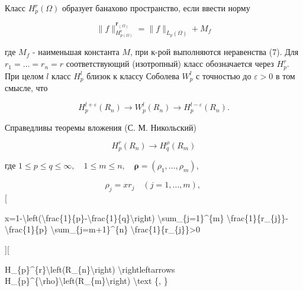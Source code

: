 \documentclass[10pt]{article}
\begin{document}
Класс $H_{p}^{r}(\Omega)$ образует банахово пространство, если ввести норму



\[

\|f\|_{H_{p(\Omega)}^{r}}^{\boldsymbol{r}_{(\Omega)}}=\|f\|_{L_{p}(\Omega)}+M_{f}

\]



где $M_{f}$ - наименьшая константа $M$, при к-рой выполняются неравенства (7). Для $r_{1}=\ldots=r_{n}=r$ соответствующий (изотропный) класс обозначается через $H_{p}^{r}$. При целом $l$ класс $H_{p}^{l}$ близок к классу Соболева $W_{p}^{l}$ с точностью до $\varepsilon>0$ в том смысле, что



\[

H_{p}^{l+\varepsilon}\left(R_{n}\right) \longrightarrow W_{p}^{l}\left(R_{n}\right) \longrightarrow H_{p}^{l-\varepsilon}\left(R_{n}\right) .

\]



Справедливы теоремы вложения (С. М. Никольский)



\[

H_{p}^{r}\left(R_{n}\right) \longrightarrow H_{q}^{\rho}\left(R_{m}\right)

\]



где $1 \leqslant p \leqslant q \leqslant \infty, \quad 1 \leqslant m \leqslant n, \quad \boldsymbol{\rho}=\left(\rho_{1}, \ldots, \rho_{m}\right)$,



\[

\rho_{j}=x r_{j} \quad(j=1, \ldots, m) \text {, }

\][



x=1-\textbackslash left(\textbackslash frac\{1\}\{p\}-\textbackslash frac\{1\}\{q\}\textbackslash right) \textbackslash sum\_\{j=1\}\^{}\{m\} \textbackslash frac\{1\}\{r\_\{j\}\}-\textbackslash frac\{1\}\{p\} \textbackslash sum\_\{j=m+1\}\^{}\{n\} \textbackslash frac\{1\}\{r\_\{j\}\}>0



][



H\_\{p\}\^{}\{r\}\textbackslash left(R\_\{n\}\textbackslash right) \textbackslash rightleftarrows H\_\{p\}\^{}\{\textbackslash rho\}\textbackslash left(R\_\{m\}\textbackslash right) \textbackslash text \{, \}
\end{document}
